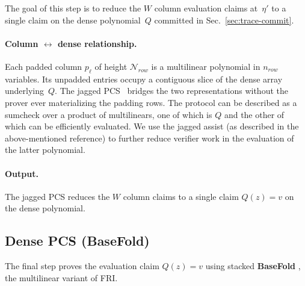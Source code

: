 \documentclass[11pt]{article}
\begin{document}
The goal of this step is to reduce the $W$ column evaluation claims at~$\eta'$
to a single claim on the dense polynomial~$Q$ committed in
Sec.~\ref{sec:trace-commit}.

\paragraph{Column $\leftrightarrow$ dense relationship.}
Each padded column $p_\ell$ of height $\mathcal{N}_{row}$ is a multilinear
polynomial in $n_{row}$ variables.
Its unpadded entries occupy a contiguous slice of the dense array underlying~$Q$.
The jagged PCS~\cite{DBLP:journals/iacr/HemoJRRR25} bridges the two representations without the prover ever materializing
the padding rows.
The protocol can be described as a sumcheck over a product of multilinears, one of which is $Q$ and
the other of which can be efficiently evaluated.
We use the jagged assist (as described in the above-mentioned reference) to further reduce verifier work in the evaluation
of the latter polynomial.

\paragraph{Output.}
The jagged PCS reduces the $W$ column claims to a single claim
$Q(z)=v$ on the dense polynomial.

\subsection{Dense PCS (BaseFold)}\label{sec:dense-pcs}

The final step proves the evaluation claim $Q(z)=v$ using
stacked \textbf{BaseFold} \cite{DBLP:conf/crypto/ZeilbergerCF24}, the multilinear variant of FRI.
\end{document}
